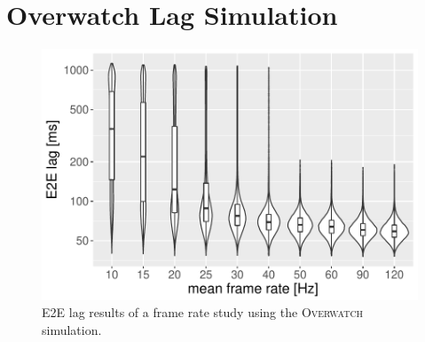 \section{Overwatch Lag Simulation}
\label{sec:simulation}

\begin{figure}
	\centering
	\includegraphics[width=1.0\columnwidth]{images/lagsim.pdf}
	\caption{\acrshort{E2E} lag results of a frame rate study using the \textsc{Overwatch} simulation.}
\label{fig:lagsim}
\end{figure}


